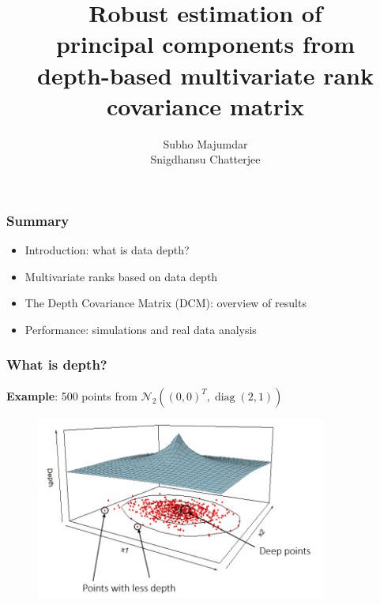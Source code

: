 \documentclass[handout,10pt]{beamer}
\title[Depth PCA]
{\Large  
Robust estimation of \\principal components from \\depth-based multivariate rank covariance matrix}
\author[Subho Majumdar]{Subho Majumdar\\ Snigdhansu Chatterjee}
\institute[]{University of Minnesota, School of Statistics\\July 9, 2015}
\date {}
\date [July 9, 2015]
\DeclareMathOperator*{\diag}{diag}
\begin{document}
\frame{ \titlepage}



\begin{frame}
\frametitle{Summary}
\begin{itemize}
\item Introduction: what is data depth?
\vspace{.5cm}
\item Multivariate ranks based on data depth
\vspace{.5cm}
\item The Depth Covariance Matrix (DCM): overview of results
\vspace{.5cm}
\item Performance: simulations and real data analysis
\end{itemize}
\end{frame}

\begin{frame}
\frametitle{What is depth?}
\textbf{Example}: 500 points from $\mathcal{N}_2 ((0,0)^T, \diag (2,1))$
\begin{figure}\begin{center}
   \includegraphics[height=6cm]{depthplot.png}
   \label{fig:fig1}
\end{center}\end{figure}
\end{frame}
\end{document}
